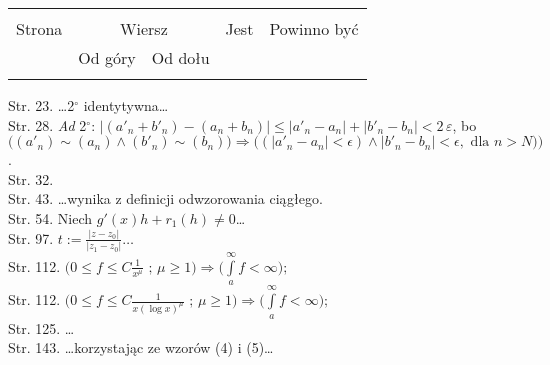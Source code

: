 \documentclass[a4paper,11pt]{article}
\begin{document}


\begin{center}

  \begin{tabular}{|c|c|c|c|c|}
    \hline
    & \multicolumn{2}{c|}{} & & \\
    Strona & \multicolumn{2}{c|}{Wiersz} & Jest
                              & Powinno być \\ \cline{2-3}
    & Od góry & Od dołu & & \\
    \hline
    & & & & \\
    \hline
  \end{tabular}

\end{center}


\noindent
Str. 23. \ldots 2$^{ \circ }$ identytywna\ldots \\
Str. 28. \textit{Ad} 2$^{ \circ }$: $| ( a'_{ n } + b'_{ n } )
- ( a_{ n } + b_{ n } ) |  \leq | a'_{ n } - a_{ n } | + | b'_{ n } - b_{ n } |
< 2 \, \varepsilon$, bo \\
$\big( ( a'_{ n } ) \sim ( a_{ n } ) \wedge( b'_{ n } ) \sim ( b_{ n } ) \big)
\Rightarrow \big( ( | a'_{ n } - a_{ n } | < \epsilon )
\wedge | b'_{ n } - b_{ n } | < \epsilon, \textrm{ dla } n > N ) \big)$. \\
Str. 32. \\
Str. 43. \ldots wynika z definicji odwzorowania ciągłego. \\
Str. 54. Niech $g'( x ) h + r_{ 1 }( h ) \neq 0$\ldots \\
Str. 97. $t := \frac{ | z - z_{ 0 } | }{ | z_{ 1 } - z_{ 0 } | }
\textrm{\ldots}$ \\
Str. 112.
$\big( 0 \leq f \leq C \frac{ 1 }{ x^{ \mu } } \textrm{ ; } \mu \geq 1 \big)
\Rightarrow \big( \int \limits^{ \infty }_{ a } f < \infty \big) \textrm{;}$ \\
Str. 112.
$\big( 0 \leq f \leq C \frac{ 1 }{ x ( \log x )^{ \mu } } \textrm{ ; } \mu \geq 1 \big)
\Rightarrow \big( \int \limits^{ \infty }_{ a } f < \infty \big) \textrm{;}$ \\
Str. 125. \ldots \\
Str. 143. \ldots korzystając ze wzorów (4) i (5)\ldots


\vspace{\spaceTwo}
\end{document}
